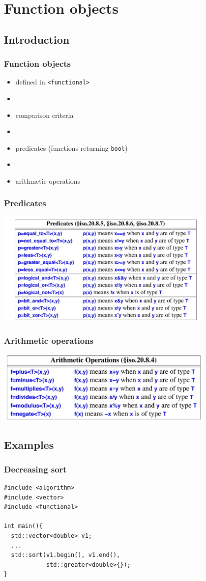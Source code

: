 \section{Function objects}
\subsection{Introduction}
\begin{frame}
  \frametitle{Function objects}
  \begin{itemize}
  \item defined in \texttt{<functional>}
  \item[]
  \item comparison criteria
  \item[]
  \item predicates (functions returning \texttt{bool})
  \item[]
  \item arithmetic operations
  \end{itemize}
\end{frame}
\begin{frame}
  \frametitle{Predicates}
  \centering
  \includegraphics[width=0.8\textwidth]{img/predicates.png}
\end{frame}
\begin{frame}
  \frametitle{Arithmetic operations}
  \centering
  \includegraphics[width=0.8\textwidth]{img/arithmetic.png}
\end{frame}

\subsection{Examples}
\begin{frame}[fragile]
  \frametitle{Decreasing sort}
\begin{lstlisting}
#include <algorithm>
#include <vector>
#include <functional>
  
int main(){
  std::vector<double> v1;
  ...
  std::sort(v1.begin(), v1.end(),
            std::greater<double>{});
}
\end{lstlisting}
\end{frame}

